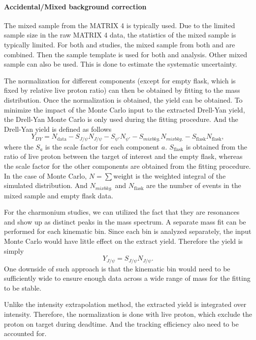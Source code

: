 \documentclass[../main.tex]{subfiles}
\begin{document}
\paragraph{Accidental/Mixed background correction}
The mixed sample from the MATRIX 4 is typically used. Due to the limited sample size in the raw
MATRIX 4 data, the statistics of the mixed sample is typically limited. For both  and
 studies, the mixed sample from both  and  are combined. Then the sample
template is used for both  and  analysis.
Other mixed sample can also be used. This is done to estimate the systematic uncertainty.

The normalization for different components (except for empty flask, which is fixed by relative live proton ratio)
can then be obtained by fitting to the mass distribution. Once the normalization is obtained, the yield can be
obtained. To minimize the impact of the Monte Carlo input to the extracted Drell-Yan yield, the Drell-Yan Monte
Carlo is only used during the fitting procedure. And the Drell-Yan yield is defined as follows
\begin{equation}
	Y_{DY}= N_{\textrm{data}}-S_{J/\psi} N_{J/\psi}-S_{\psi'} N_{\psi'}-S_{mix bkg.} N_{mix bkg.} - S_{\textrm{flask}} N_{\textrm{flask}},
\end{equation}
where the $S_a$ is the scale factor for each component $a$. $S_{\textrm{flask}}$ is obtained from the
ratio of live proton between the target of interest and the empty flask,
whereas the scale factor for the other components are obtained from the fitting procedure.
In the case of Monte Carlo, $N=\sum\textrm{weight}$  is the weighted integral of the
simulated distribution. And $N_{mix bkg.}$ and $N_{\textrm{flask}}$ are the number of events in the mixed
sample and empty flask data.

For the charmonium studies, we can utilized the fact that they are resonances and show up as distinct peaks
in the mass spectrum. A separate mass fit can be performed for each kinematic bin. Since each bin is analyzed
separately, the input Monte Carlo would have little effect on the extract yield. Therefore the yield is simply
\begin{equation}
	Y_{J/\psi}= S_{J/\psi} N_{J/\psi}.
\end{equation}
One downside of such approach is that the kinematic bin would need to be sufficiently wide to ensure enough
data across a wide range of mass for the fitting to be stable.

Unlike the intensity extrapolation method, the extracted yield is integrated over intensity. Therefore, the
normalization is done with live proton, which exclude the proton on target during deadtime. And the tracking
efficiency also need to be accounted for.
\end{document}
